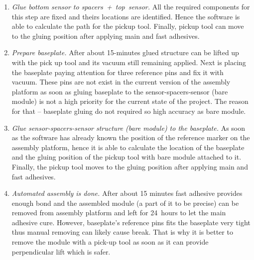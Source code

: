 \begin{enumerate}
\item \emph{Glue bottom sensor to spacers~+~top~sensor.} All the required components for this step are fixed and theirs locations are identified. Hence the software is able to calculate the path for the pickup tool. Finally, pickup tool can move to the gluing position after applying main and fast adhesives.
\item \emph{Prepare baseplate.} After about 15-minutes glued structure can be lifted up with the pick up tool and its vacuum still remaining applied. Next is placing the baseplate paying attention for three reference pins and fix it with vacuum. These pins are not exist in the current version of the assembly platform as soon as gluing baseplate to the sensor-spacers-sensor (bare module) is not a high priority for the current state of the project. The reason for that -- baseplate gluing do not required so high accuracy as bare module.
\item \emph{Glue sensor-spacers-sensor structure (bare module) to the baseplate.} As soon as the software has already known the position of the reference marker on the assembly platform, hence it is able to calculate the location of the baseplate and the gluing position of the pickup tool with bare module attached to it. Finally, the pickup tool moves to the gluing position after applying main and fast adhesives.
\item \emph{Automated assembly is done.} After about 15 minutes fast adhesive provides enough bond and the assembled module (a part of it to be precise) can be removed from assembly platform and left for 24~hours to let the main adhesive cure. However, baseplate's reference pins fits the baseplate very tight thus manual removing can likely cause break. That is why it is better to remove the module with a pick-up tool as soon as it can provide perpendicular lift which is safer.
\end{enumerate}